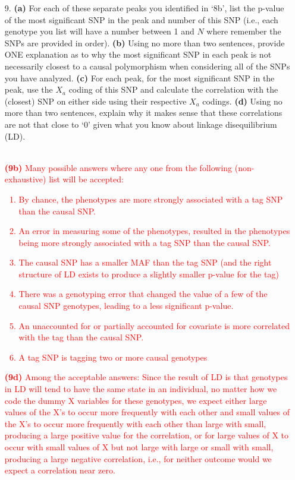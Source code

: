 \documentclass[letterpaper, 11pt]{article}
\begin{document}
\begin{itemize}
\item[9.] \textbf{(a)} For each of these separate peaks you identified in `8b', list the p-value of the most significant SNP in the peak and number of this SNP (i.e., each genotype you list will have a number between 1 and $N$ where remember the SNPs are provided in order).   \textbf{(b)} Using no more than two sentences, provide ONE explanation as to why the most significant SNP in each peak is not necessarily closest to a causal polymorphism when considering all of the SNPs you have analyzed.  \textbf{(c)} For each peak, for the most significant SNP in the peak, use the $X_a$ coding of this SNP and calculate the correlation with the (closest) SNP on either side using their respective $X_a$ codings. \textbf{(d)} Using no more than two sentences, explain why it makes sense that these correlations are not that close to `0' given what you know about linkage disequilibrium (LD). 
\\
\\
\textcolor{red}{ 
\textbf{(9b)} Many possible answers where any one from the following (non-exhaustive) list will be accepted:
\begin{enumerate}
\item By chance, the phenotypes are more strongly associated with a tag SNP than the causal SNP.
\item An error in measuring some of the phenotypes, resulted in the phenotypes being more strongly associated with a tag SNP than the causal SNP.
\item The causal SNP has a smaller MAF than the tag SNP (and the right structure of LD exists to produce a slightly smaller p-value for the tag) 
\item There was a genotyping error that changed the value of a few of the causal SNP genotypes, leading to a less significant p-value.
\item An unaccounted for or partially accounted for covariate is more correlated with the tag than the causal SNP.
\item A tag SNP is tagging two or more causal genotypes
\end{enumerate}

\textbf{(9d)} Among the acceptable answers: Since the result of LD is that genotypes in LD will tend to have the same state in an individual, no matter how we code the dummy X variables for these genotypes, we expect either large values of the X's to occur more frequently with each other and small values of the X's to occur more frequently with each other than large with small, producing a large positive value for the correlation, or for large values of X to occur with small values of X but not large with large or small with small, producing a large negative correlation, i.e., for neither outcome would we expect a correlation near zero. 
} 


\end{itemize}
\end{document}
